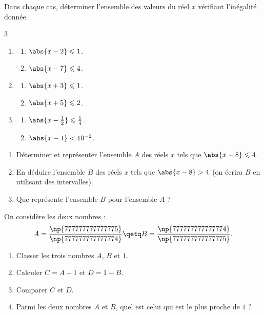 \exo

Dans chaque cas, déterminer l'ensemble des valeurs du réel $x$ vérifiant l'inégalité donnée.

\vspace{-6pt}
\setlength{\columnsep}{1cm}
\setlength{\columnseprule}{0pt}
\begin{multicols}{3}
\begin{enumerate}
\item 
\begin{enumerate}
\item $\abs{x-2}\leqslant 1$.

\medskip
\item $\abs{x-7}\leqslant 4$.
\end{enumerate}
\item 
\begin{enumerate}
\item $\abs{x+3}\leqslant 1$.

\medskip
\item $\abs{x+5}\leqslant 2$.
\end{enumerate}
\item 
\begin{enumerate}
\item $\abs{x-\frac{1}{2}}\leqslant \frac{1}{4}$.

\medskip
\item $\abs{x-1}< 10^{-2}$.
\end{enumerate}
\end{enumerate}
\end{multicols}

\exo

\begin{enumerate}
\item Déterminer et représenter l'ensemble $A$ des réels $x$ tels que $\abs{x-8}\leqslant 4$.
\item En déduire  l'ensemble $B$ des réels $x$ tels que $\abs{x-8}> 4$ (on écrira $B$ en utilisant des intervalles).
\item Que représente l'ensemble $B$ pour l'ensemble $A$ ?
\end{enumerate}

\exo

On considère les deux nombres :
\[
A=\frac{\np{777777777777775}}{\np{777777777777774}}
\qetq
B=\frac{\np{777777777777774}}{\np{777777777777775}}.
\]
\begin{enumerate}
\item Classer les trois nombres $A$, $B$ et $1$.
\item Calculer $C=A-1$ et $D=1-B$.
\item Comparer $C$ et $D$.
\item Parmi les deux nombres $A$ et $B$, quel est celui qui est le plus proche de $1$ ?
\end{enumerate}

